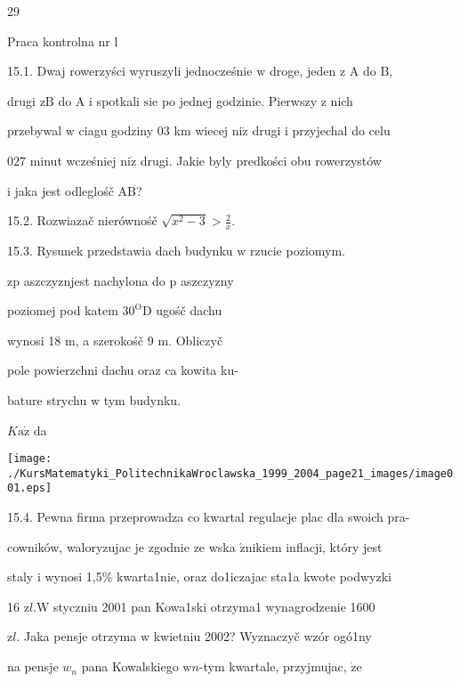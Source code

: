 \documentclass[a4paper,12pt]{article}
\begin{document}
29

Praca kontrolna nr l

15.1. Dwaj rowerzyści wyruszyli jednocześnie $\mathrm{w}$ droge, jeden $\mathrm{z}$ A do $\mathrm{B},$

drugi $\mathrm{z} \mathrm{B}$ do A $\mathrm{i}$ spotkali $\mathrm{s}\mathrm{i}\mathrm{e}$ po jednej godzinie. Pierwszy $\mathrm{z}$ nich

przebywal $\mathrm{w}$ ciagu godziny $03$ km wiecej $\mathrm{n}\mathrm{i}\dot{\mathrm{z}}$ drugi $\mathrm{i}$ przyjechal do celu

$027$ minut wcześniej $\mathrm{n}\mathrm{i}\dot{\mathrm{z}}$ drugi. Jakie byly predkości obu rowerzystów

$\mathrm{i}$ jaka jest odleglośč AB?

15.2. Rozwiazač nierównośč $\displaystyle \sqrt{x^{2}-3}>\frac{2}{x}.$

15.3. Rysunek przedstawia dach budynku $\mathrm{w}$ rzucie poziomym.

$\mathrm{z}\mathrm{p}$ aszczyznjest nachylona do $\mathrm{p}$ aszczyzny

poziomej pod katem $30^{\mathrm{O}} \mathrm{D}$ ugośč dachu

wynosi 18 $\mathrm{m}$, a szerokośč 9 $\mathrm{m}$. Obliczyč

pole powierzchni dachu oraz ca kowita ku-

bature strychu $\mathrm{w}$ tym budynku.

$K\mathrm{a}\dot{\mathrm{z}}$ da
\begin{center}
\texttt{[image: ./KursMatematyki\_PolitechnikaWroclawska\_1999\_2004\_page21\_images/image001.eps]}
\end{center}
15.4. Pewna firma przeprowadza co kwartal regulacje plac dla swoich pra-

cowników, waloryzujac je zgodnie ze wska $\acute{\mathrm{z}}\mathrm{n}\mathrm{i}\mathrm{k}\mathrm{i}\mathrm{e}\mathrm{m}$ inflacji, który jest

staly $\mathrm{i}$ wynosi 1,5\% kwarta1nie, oraz do1iczajac sta1a kwote podwyzki

16 $\mathrm{z}l. \mathrm{W}$ styczniu 2001 pan Kowa1ski otrzyma1 wynagrodzenie 1600

$\mathrm{z}l$. Jaka pensje otrzyma $\mathrm{w}$ kwietniu 2002? Wyznaczyč wzór ogó1ny

na pensje $w_{n}$ pana Kowalskiego $\mathrm{w}n$-tym kwartale, przyjmujac, $\dot{\mathrm{z}}\mathrm{e}$
\end{document}

